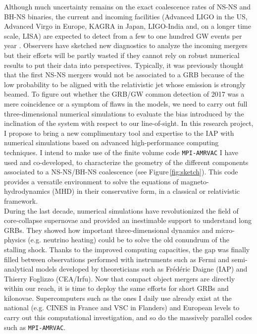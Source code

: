 \documentclass[11pt,onecolumn]{article}
\makeatletter
\newcommand{\gw}{GW\xspace}
\newcommand{\grb}{GRB\xspace}
\newcommand{\grbs}{GRBs\xspace}
\newcommand{\mhd}{MHD\xspace}
\newcommand*{\ns}{NS\@\xspace}
\newcommand*{\bh}{BH\@\xspace}
\newcommand*{\eg}{e.g.\@\xspace}
\makeatother
\begin{document}
Although much uncertainty remains on the exact coalescence rates of \ns-\ns and \bh-\ns binaries, the current and incoming facilities (Advanced LIGO in the US, Advanced Virgo in Europe, KAGRA in Japan, LIGO-India and, on a longer time scale, LISA) are expected to detect from a few to one hundred \gw events per year \citep{Kim2015}. Observers have sketched new diagnostics \citep{Gill2018} to analyze the incoming mergers but their efforts will be partly wasted if they cannot rely on robust numerical results to put their data into perspectives. Typically, it was previously thought that the first \ns-\ns mergers would not be associated to a \grb because of the low probability to be aligned with the relativistic jet whose emission is strongly beamed. To figure out whether the \grb/\gw common detection of 2017 was a mere coincidence or a symptom of flaws in the models, we need to carry out full three-dimensional numerical simulations to evaluate the bias introduced by the inclination of the system with respect to our line-of-sight. In this research project, I propose to bring a new complimentary tool and expertise to the IAP with numerical simulations based on advanced high-performance computing techniques. I intend to make use of the finite volume code \texttt{MPI-AMRVAC} I have used and co-developed, to characterize the geometry of the different components associated to a \ns-\ns/\bh-\ns coalescence (see Figure\,\ref{fig:sketch}). This code provides a versatile environment to solve the equations of magneto-hydrodynamics (\mhd) in their conservative form, in a classical or relativistic framework. \\

During the last decade, numerical simulations have revolutionized the field of core-collapse supernovae and provided an inestimable support to understand long \grbs. They showed how important three-dimensional dynamics and micro-physics (\eg neutrino heating) could be to solve the old conundrum of the stalling shock. Thanks to the improved computing capacities, the gap was finally filled between observations performed with instruments such as Fermi and semi-analytical models developed by theoreticians such as Frédéric Daigne (IAP) and Thierry Foglizzo (CEA/Irfu). Now that compact object mergers are directly within our reach, it is time to deploy the same efforts for short \grbs and kilonovae. Supercomputers such as the ones I daily use already exist at the national (\eg CINES in France and VSC in Flanders) and European levels to carry out this computational investigation, and so do the massively parallel codes such as \texttt{MPI-AMRVAC}. \\
\end{document}
